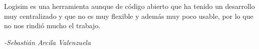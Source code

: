 Logisim es una herramienta aunque de código abierto que ha tenido un
desarrollo muy centralizado y que no es muy flexible y además muy poco
usable, por lo que no nos rindió mucho el trabajo.

\begin{flushright} 
	\itshape{-Sebastián Arcila Valenzuela}
\end{flushright}
